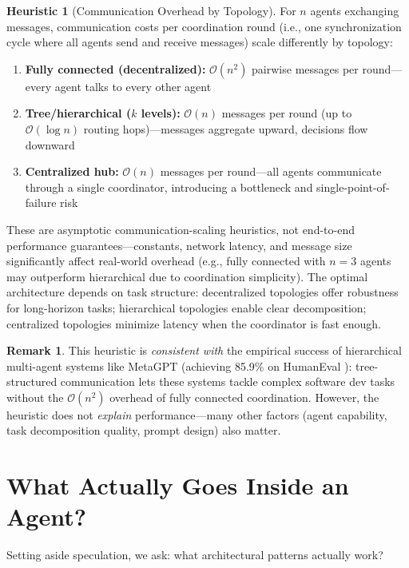 \documentclass[12pt,a4paper]{report}
\theoremstyle{definition}
\newtheorem{remark}[theorem]{Remark}
\newtheorem{heuristic}[theorem]{Heuristic}
\begin{document}
\begin{heuristic}[Communication Overhead by Topology]
\label{thm:multiagent}
For $n$ agents exchanging messages, communication costs per coordination round (i.e., one synchronization cycle where all agents send and receive messages) scale differently by topology:
\begin{enumerate}
    \item \textbf{Fully connected (decentralized):} $\mathcal{O}(n^2)$ pairwise messages per round---every agent talks to every other agent
    \item \textbf{Tree/hierarchical ($k$ levels):} $\mathcal{O}(n)$ messages per round (up to $\mathcal{O}(\log n)$ routing hops)---messages aggregate upward, decisions flow downward
    \item \textbf{Centralized hub:} $\mathcal{O}(n)$ messages per round---all agents communicate through a single coordinator, introducing a bottleneck and single-point-of-failure risk
\end{enumerate}
These are asymptotic communication-scaling heuristics, not end-to-end performance guarantees---constants, network latency, and message size significantly affect real-world overhead (e.g., fully connected with $n=3$ agents may outperform hierarchical due to coordination simplicity). The optimal architecture depends on task structure: decentralized topologies offer robustness for long-horizon tasks; hierarchical topologies enable clear decomposition; centralized topologies minimize latency when the coordinator is fast enough.
\end{heuristic}

\begin{remark}
This heuristic is \emph{consistent with} the empirical success of hierarchical multi-agent systems like MetaGPT (achieving 85.9\% on HumanEval \cite{hong2023metagpt}): tree-structured communication lets these systems tackle complex software dev tasks without the $\mathcal{O}(n^2)$ overhead of fully connected coordination. However, the heuristic does not \emph{explain} performance---many other factors (agent capability, task decomposition quality, prompt design) also matter.
\end{remark}

\section{What Actually Goes Inside an Agent?}
\label{sec:architectures}

Setting aside speculation, we ask: what architectural patterns actually work?
\end{document}
